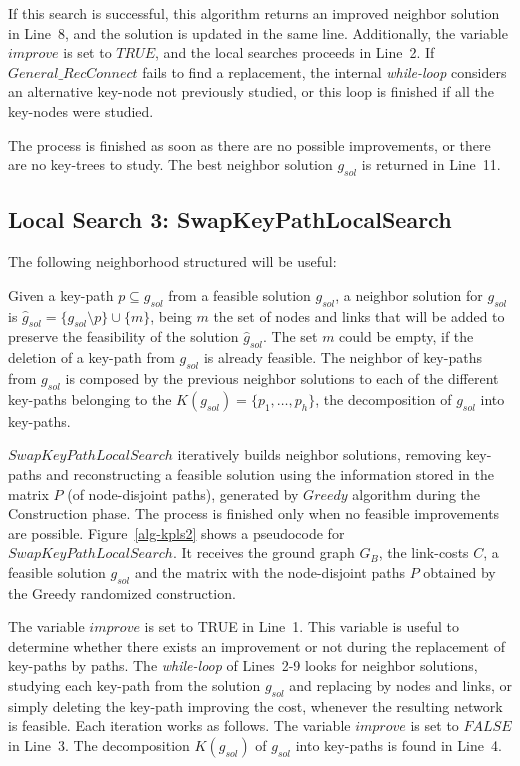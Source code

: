If this search is successful, this algorithm returns an improved neighbor solution in Line~8, and the solution is 
updated in the same line. Additionally, the variable $improve$ is set to $TRUE$, 
and the local searches proceeds in Line~2. If $General\_RecConnect$ fails to find a replacement, the internal 
\textit{while-loop} considers an alternative key-node not previously studied, 
or this loop is finished if all the key-nodes were studied. 

The process is finished as soon as there are no possible improvements, or there are no key-trees to study. 
The best neighbor solution $g_{sol}$ is returned in Line~11. 

\subsection{Local Search 3: SwapKeyPathLocalSearch}
The following neighborhood structured will be useful:

\begin{definition}
Given a key-path $p \subseteq g_{sol}$ from a feasible solution $g_{sol}$, 
a neighbor solution for $g_{sol}$ is $\hat{g}_{sol} = \{ g_{sol}\setminus p \}\cup \{m\}$, 
being $m$ the set of nodes and links that will be added to preserve the feasibility of the 
solution ${\hat{g}}_{sol}$.  
The set $m$ could be empty, if the deletion of a key-path from $g_{sol}$ is already feasible. 
The neighbor of key-paths from $g_{sol}$ is composed by the previous neighbor solutions 
to each of the different key-paths belonging to the $K(g_{sol}) = \{p_1,\ldots,p_h\}$, 
the decomposition of $g_{sol}$ into key-paths. 
\end{definition}

$SwapKeyPathLocalSearch$ iteratively builds neighbor solutions, removing 
key-paths and reconstructing a feasible solution using the information stored in the 
matrix $P$ (of node-disjoint paths), generated by $Greedy$ algorithm during the Construction phase. The process 
is finished only when no feasible improvements are possible. Figure~\ref{alg-kpls2} shows a pseudocode for $SwapKeyPathLocalSearch$. It receives 
the ground graph $G_B$, the link-costs $C$, a feasible solution $g_{sol}$ and the matrix with the node-disjoint paths $P$ obtained by the Greedy randomized construction.

The variable $improve$ is set to TRUE in Line~1. This variable is useful to determine whether there exists 
an improvement or not during the replacement of key-paths by paths. The \textit{while-loop} 
of Lines~2-9 looks for neighbor solutions, studying each key-path from the solution $g_{sol}$ and 
replacing by nodes and links, or simply deleting the key-path improving the cost, whenever the resulting network 
is feasible. Each iteration works as follows. The variable $improve$ is set to $FALSE$ in Line~3. The decomposition 
$K(g_{sol})$  of $g_{sol}$ into key-paths is found in Line~4. 

